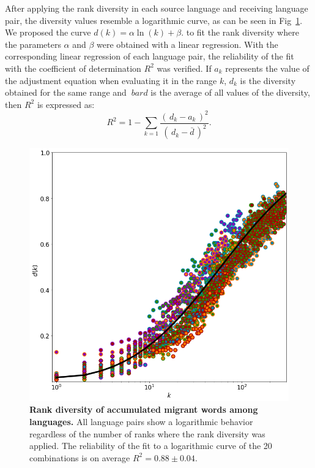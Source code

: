 \documentclass[10pt,letterpaper]{article} %
\begin{document}
	After applying the rank diversity in each source language and receiving language pair, the diversity values resemble a logarithmic curve, as can be seen in Fig~\ref{fig.DR_art}. We proposed the curve $d(k) =  \alpha \ln(k) + \beta.$ to fit the rank diversity where the parameters $\alpha$ and $\beta$ were obtained with a linear regression. With the corresponding linear regression of each language pair, the reliability of the fit with the coefficient of determination $R^{2}$ was verified. If $ a_ {k} $ represents the value of the adjustment equation when evaluating it in the range $ k $, $ d_ {k} $ is the diversity obtained for the same range and $ \ bar {d} $ is the average of all values of the diversity, then $R^{2}$ is expressed as:
	\begin{equation}
	R^{2} = 1 - \sum_{k = 1} \frac{ \left( \,d_{k} - a_{k} \,\right)^{2}  }{ \left( \, d_{k} - \bar{d} \,\right)^{2} }.	
	\label{ec.r2_diversidad}
	\end{equation}
	
	\begin{figure}[!h]
		\begin{adjustwidth}{-2.5cm}{1cm}
			\centering
			\includegraphics[scale=.38]{DR_art.png}
			\caption{{\bf Rank diversity of accumulated migrant words among languages.} All language pairs show a logarithmic behavior regardless of the number of ranks where the rank diversity was applied. The reliability of the fit to a logarithmic curve of the 20 combinations is on average $R^{2}= 0.88 \pm 0.04$.}
			\label{fig.DR_art}
		\end{adjustwidth}
	\end{figure}
	
\end{document}
